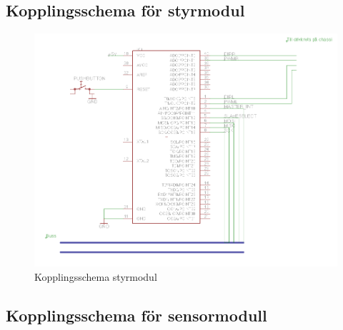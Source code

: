 \documentclass[a4paper,12pt,fleqn]{article}
\begin{document}
\subsection{Kopplingsschema för styrmodul}

\begin{figure}[ht] %
  \begin{center}
  \includegraphics[keepaspectratio=true,width=\linewidth]{kopplingsschema_styrmodul.png}  %
  \end{center}
  \caption{Kopplingsschema styrmodul} %
  \label{fig:kopplingstyr} %
\end{figure}
 \clearpage %
 

\subsection{Kopplingsschema för sensormodull}
\end{document}
